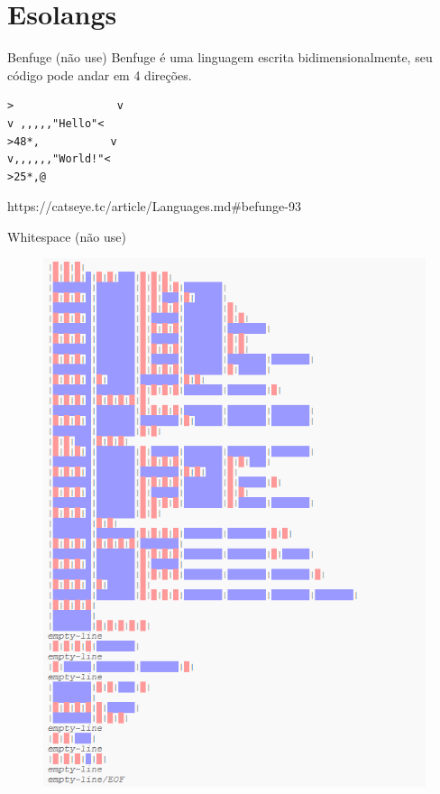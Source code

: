 \section{Esolangs}

\begin{frame}[fragile]{Benfuge (não use)}
\small{Benfuge é uma linguagem escrita bidimensionalmente, seu código pode andar em 4 direções.}
\lstset{language=Rust, style=boxed}
\begin{lstlisting}
>                v
v ,,,,,"Hello"<
>48*,           v
v,,,,,,"World!"<
>25*,@
\end{lstlisting}
\small{https://catseye.tc/article/Languages.md\#befunge-93}
\end{frame}

\begin{frame}[fragile]{Whitespace (não use)}
\begin{figure}[ht!]
  \centering
  \includegraphics[scale=0.4]{images/whitespace.png}
\end{figure}
\end{frame}

